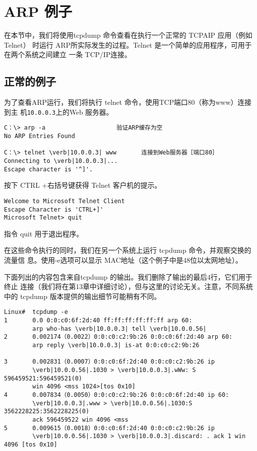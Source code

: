 \section{ARP 例子}

在本节中，我们将使用tcpdump 命令查看在执行一个正常的 TCPAIP 应用（例如 Telnet）
时运行 ARP所实际发生的过程。Telnet 是一个简单的应用程序，可用于在两个系统之间建立
一条 TCP/IP连接。

\subsection{正常的例子}

为了查看ARP运行，我们将执行 telnet 命令，使用TCP端口80（称为www）连接到主
机\verb|10.0.0.3|上的Web 服务器。

\begin{verbatim}
C：\> arp -a                    验证ARP缓存为空
No ARP Entries Found

C：\> telnet \verb|10.0.0.3| www       连接到Web服务器［端口80］
Connecting to \verb|10.0.0.3|...
Escape character is '^]'.
\end{verbatim}

按下 CTRL +右括号键获得 Telnet 客户机的提示。
\begin{verbatim}
Welcome to Microsoft Telnet Client
Escape Character is 'CTRL+]'
Microsoft Telnet> quit
\end{verbatim}
指令 quit 用于退出程序。

在这些命令执行的同时，我们在另一个系统上运行 tcpdump 命令，并观察交换的流量信
息。使用-e选项可以显示 MAC地址（这个例子中是48位以太网地址）。

下面列出的内容包含来自tcpdump 的输出。我们删除了输出的最后4行，它们用于终止
连接（我们将在第13章中详细讨论），但与这里的讨论无关。注意，不同系统中的 tcpdump
版本提供的输出细节可能稍有不同。

\begin{verbatim}
Linux#  tcpdump -e
1       0.0 0:0:c0:6f:2d:40 ff:ff:ff:ff:ff:ff arp 60:
        arp who-has \verb|10.0.0.3| tell \verb|10.0.0.56|
2       0.002174（0.0022）0:0:c0:c2:9b:26 0:0:c0:6f:2d:40 arp 60:
        arp reply \verb|10.0.0.3| is-at 0:0:c0:c2:9b:26

3       0.002831（0.0007）0:0:c0:6f:2d:40 0:0:c0:c2:9b:26 ip
        \verb|10.0.0.56|.1030 > \verb|10.0.0.3|.wWw: S 596459521:596459521(0)
        win 4096 <mss 1024>[tos 0x10]
4       0.007834（0.0050）0:0:c0:c2:9b:26 0:0:c0:6f:2d:40 ip 60:
        \verb|10.0.0.3|.www > \verb|10.0.0.56|.1030:S 3562228225:3562228225(0)
        ack 596459522 win 4096 <mss
5       0.009615（0.0018）0:0:c0:6f:2d:40 0:0:c0:c2:9b:26 ip
        \verb|10.0.0.56|.1030 > \verb|10.0.0.3|.discard: . ack 1 win 4096 [tos 0x10]
\end{verbatim}

